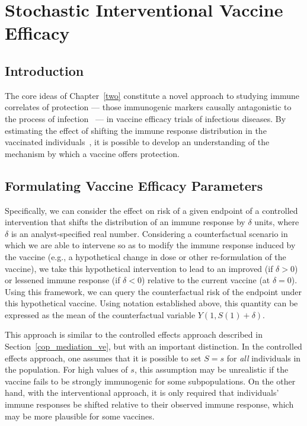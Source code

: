\chapter{Stochastic Interventional Vaccine Efficacy}\label{three}

\section{Introduction}

The core ideas of Chapter~\ref{two} constitute a novel approach to studying
immune correlates of protection --- those immunogenic markers causally
antagonistic to the process of infection~\citep{plotkin2012nomenclature} --- in
vaccine efficacy trials of infectious diseases. By estimating the effect of
shifting the immune response distribution in the vaccinated
individuals~\citep{hejazi2020efficient}, it is possible to develop an
understanding of the mechanism by which a vaccine offers protection.

\section{Formulating Vaccine Efficacy Parameters}

Specifically, we can consider the
effect on risk of a given endpoint of a controlled intervention that shifts the
distribution of an immune response by $\delta$ units, where $\delta$ is an
analyst-specified real number. Considering a counterfactual scenario in which we
are able to intervene so as to modify the immune response induced by the vaccine
(e.g., a hypothetical change in dose or other re-formulation of the vaccine), we
take this hypothetical intervention to lead to an improved (if $\delta > 0$) or
lessened immune response (if $\delta < 0$) relative to the current vaccine (at
$\delta = 0$). Using this framework, we can query the counterfactual risk of the
endpoint under this hypothetical vaccine. Using notation established above, this
quantity can be expressed as the mean of the counterfactual variable $Y(1, S(1)
+ \delta)$.

This approach is similar to the controlled effects approach described in
Section~\ref{cop_mediation_ve}, but with an important distinction. In the
controlled effects approach, one assumes that it is possible to set $S = s$ for
\textit{all} individuals in the population. For high values of $s$, this
assumption may be unrealistic if the vaccine fails to be strongly immunogenic
for some subpopulations. On the other hand, with the interventional approach, it
is only required that individuals' immune responses be shifted relative to their
observed immune response, which may be more plausible for some vaccines. 

